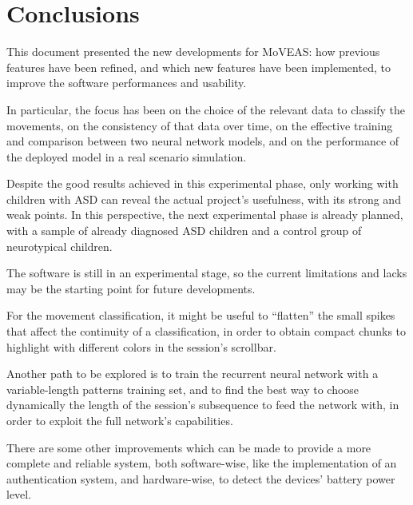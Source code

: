 \chapter{Conclusions}
This document presented the new developments for MoVEAS: how previous features have been refined, and which new features have been implemented, to improve the software performances and usability.

In particular, the focus has been on the choice of the relevant data to classify the movements, on the consistency of that data over time, on the effective training and comparison between two neural network models, and on the performance of the deployed model in a real scenario simulation.
\bigbreak

Despite the good results achieved in this experimental phase, only working with children with ASD can reveal the actual project's usefulness, with its strong and weak points. In this perspective, the next experimental phase is already planned, with a sample of already diagnosed ASD children and a control group of neurotypical children.
\bigbreak

The software is still in an experimental stage, so the current limitations and lacks may be the starting point for future developments.

For the movement classification, it might be useful to ``flatten'' the small spikes that affect the continuity of a classification, in order to obtain compact chunks to highlight with different colors in the session's scrollbar.

Another path to be explored is to train the recurrent neural network with a variable-length patterns training set, and to find the best way to choose dynamically the length of the session's subsequence to feed the network with, in order to exploit the full network's capabilities.

There are some other improvements which can be made to provide a more complete and reliable system, both software-wise, like the implementation of an authentication system, and hardware-wise, to detect the devices' battery power level.
